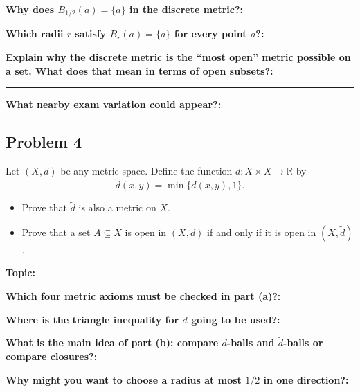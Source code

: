 \documentclass[12pt]{article}
\newcommand{\fillfield}[1]{%
  \par\noindent\textbf{#1:}\enspace\hrulefill\par\vspace{3pt}%
}
\newcommand{\fillfieldlong}[1]{%
  \par\noindent\textbf{#1:}\par\vspace{1.5cm}%
  \noindent\rule{\linewidth}{0.35pt}\par\vspace{4pt}%
}
\begin{document}
\bigskip

\begin{tcolorbox}[
  enhanced, breakable,
  colback  = reflectcyan,
  colframe = cyan!55!black,
  fonttitle = \bfseries,
  title = {\textsc{Reflection \& Variation}}
]
\fillfield{Why does $B_{1/2}(a)=\{a\}$ in the discrete metric?}
\fillfield{Which radii $r$ satisfy $B_r(a)=\{a\}$ for every point $a$?}
\fillfieldlong{Explain why the discrete metric is the ``most open'' metric possible on a set. What does that mean in terms of open subsets?}
\fillfield{What nearby exam variation could appear?}
\end{tcolorbox}

\newpage
\subsection{Problem 4}

\begin{tcolorbox}[
  enhanced, breakable,
  colback  = probblue,
  colframe = blue!55!black,
  fonttitle = \bfseries,
  title = {\textsc{Problem Statement}\hfill Homework 8, Problem 4}
]
Let $(X, d)$ be any metric space. Define the function $\tilde{d} : X \times X \to \mathbb{R}$ by
\[
  \tilde{d}(x, y) = \min\{d(x, y), 1\}.
\]
\begin{itemize}[nosep, leftmargin=1.8em]
  \item[(a)] Prove that $\tilde{d}$ is also a metric on $X$.
  \item[(b)] Prove that a set $A \subseteq X$ is open in $(X, d)$ if and only if it is open in $(X, \tilde{d})$.
\end{itemize}
\end{tcolorbox}

\bigskip

\begin{tcolorbox}[
  enhanced, breakable,
  colback  = pass1green,
  colframe = green!55!black,
  fonttitle = \bfseries,
  title = {Pass 1 \enspace\textbf{--}\enspace First Diagnosis}
]
\fillfield{Topic}
\fillfield{Which four metric axioms must be checked in part (a)?}
\fillfield{Where is the triangle inequality for $d$ going to be used?}
\fillfield{What is the main idea of part (b): compare $d$-balls and $\tilde d$-balls or compare closures?}
\fillfield{Why might you want to choose a radius at most $1/2$ in one direction?}
\end{tcolorbox}
\end{document}
